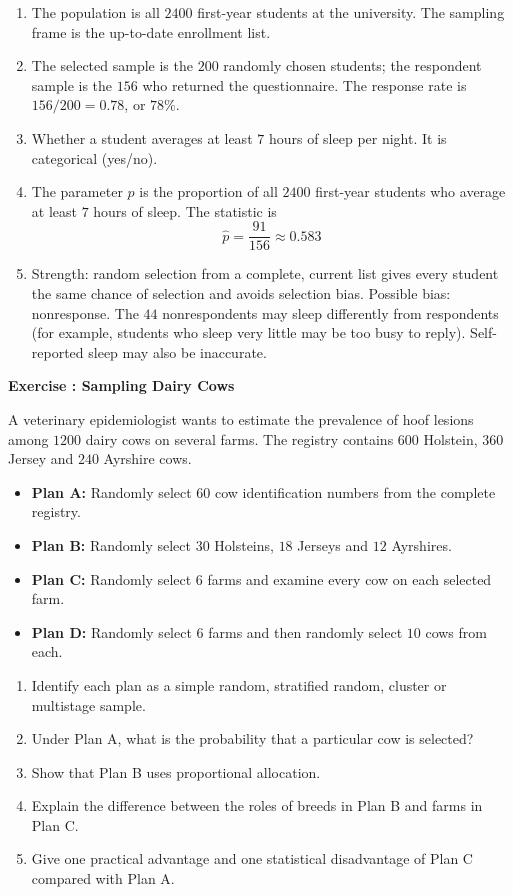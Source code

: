 \documentclass[11pt]{article}
\newcounter{exercise}
\newcommand{\exercise}[1]{%
  \par\medskip
  \refstepcounter{exercise}%
  {\large\bfseries\color{CourseBlue} Exercise \theexercise: #1}\par\smallskip}
\begin{document}
\begin{solution}
\begin{enumerate}
  \item The population is all $2400$ first-year students at the university. The sampling frame is the up-to-date enrollment list.
  \item The selected sample is the $200$ randomly chosen students; the respondent sample is the $156$ who returned the questionnaire. The response rate is $156/200=0.78$, or $78\%$.
  \item Whether a student averages at least $7$ hours of sleep per night. It is categorical (yes/no).
  \item The parameter $p$ is the proportion of all $2400$ first-year students who average at least $7$ hours of sleep. The statistic is
  \[
  \hat p=\frac{91}{156}\approx0.583
  \]
  \item Strength: random selection from a complete, current list gives every student the same chance of selection and avoids selection bias. Possible bias: nonresponse. The $44$ nonrespondents may sleep differently from respondents (for example, students who sleep very little may be too busy to reply). Self-reported sleep may also be inaccurate.
\end{enumerate}
\end{solution}

\exercise{Sampling Dairy Cows}

A veterinary epidemiologist wants to estimate the prevalence of hoof lesions among $1200$ dairy cows on several farms. The registry contains $600$ Holstein, $360$ Jersey and $240$ Ayrshire cows.

\begin{itemize}[itemsep=0.1em]
  \item \textbf{Plan A:} Randomly select $60$ cow identification numbers from the complete registry.
  \item \textbf{Plan B:} Randomly select $30$ Holsteins, $18$ Jerseys and $12$ Ayrshires.
  \item \textbf{Plan C:} Randomly select $6$ farms and examine every cow on each selected farm.
  \item \textbf{Plan D:} Randomly select $6$ farms and then randomly select $10$ cows from each.
\end{itemize}

\begin{enumerate}
  \item Identify each plan as a simple random, stratified random, cluster or multistage sample.
  \item Under Plan A, what is the probability that a particular cow is selected?
  \item Show that Plan B uses proportional allocation.
  \item Explain the difference between the roles of breeds in Plan B and farms in Plan C.
  \item Give one practical advantage and one statistical disadvantage of Plan C compared with Plan A.
\end{enumerate}
\end{document}
